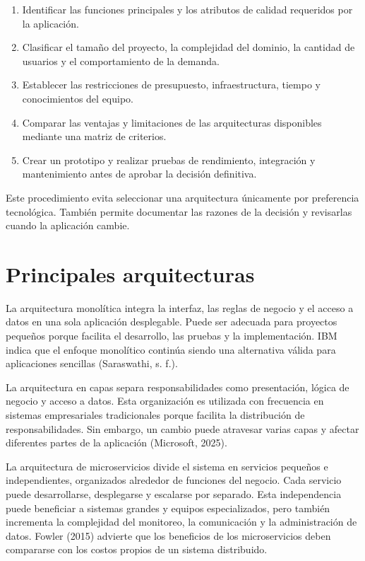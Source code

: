 \documentclass[12pt]{article}
\begin{document}
	\begin{enumerate}
		
		\item Identificar las funciones principales y los atributos de calidad
		requeridos por la aplicación.
		
		\item Clasificar el tamaño del proyecto, la complejidad del dominio, la
		cantidad de usuarios y el comportamiento de la demanda.
		
		\item Establecer las restricciones de presupuesto, infraestructura,
		tiempo y conocimientos del equipo.
		
		\item Comparar las ventajas y limitaciones de las arquitecturas
		disponibles mediante una matriz de criterios.
		
		\item Crear un prototipo y realizar pruebas de rendimiento, integración y
		mantenimiento antes de aprobar la decisión definitiva.
		
	\end{enumerate}
	
	Este procedimiento evita seleccionar una arquitectura únicamente por
	preferencia tecnológica. También permite documentar las razones de la
	decisión y revisarlas cuando la aplicación cambie.
	
	\section*{Principales arquitecturas}
	
	La arquitectura monolítica integra la interfaz, las reglas de negocio y el
	acceso a datos en una sola aplicación desplegable. Puede ser adecuada para
	proyectos pequeños porque facilita el desarrollo, las pruebas y la
	implementación. IBM indica que el enfoque monolítico continúa siendo una
	alternativa válida para aplicaciones sencillas (Saraswathi, s. f.).
	
	La arquitectura en capas separa responsabilidades como presentación, lógica
	de negocio y acceso a datos. Esta organización es utilizada con frecuencia en
	sistemas empresariales tradicionales porque facilita la distribución de
	responsabilidades. Sin embargo, un cambio puede atravesar varias capas y
	afectar diferentes partes de la aplicación (Microsoft, 2025).
	
	La arquitectura de microservicios divide el sistema en servicios pequeños e
	independientes, organizados alrededor de funciones del negocio. Cada servicio
	puede desarrollarse, desplegarse y escalarse por separado. Esta independencia
	puede beneficiar a sistemas grandes y equipos especializados, pero también
	incrementa la complejidad del monitoreo, la comunicación y la administración
	de datos. Fowler (2015) advierte que los beneficios de los microservicios deben
	compararse con los costos propios de un sistema distribuido.
	
\end{document}
